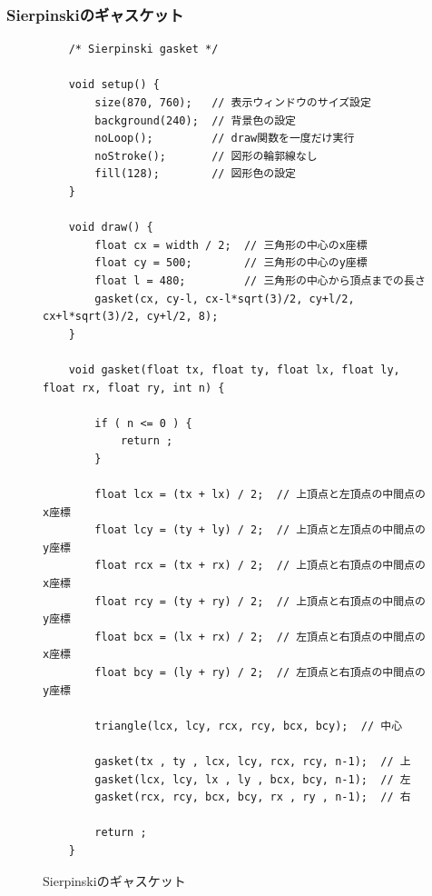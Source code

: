 \documentclass[dvipdfmx]{jsarticle}
\theoremstyle{definition}
\begin{document}
\newpage{}

\subsubsection{Sierpinskiのギャスケット}
\label{code_gasket_all}
\begin{figure}[ht]
\begin{center}
\begin{oframed}
\footnotesize
\begin{verbatim}
    /* Sierpinski gasket */

    void setup() {
        size(870, 760);   // 表示ウィンドウのサイズ設定
        background(240);  // 背景色の設定
        noLoop();         // draw関数を一度だけ実行
        noStroke();       // 図形の輪郭線なし
        fill(128);        // 図形色の設定
    }

    void draw() {
        float cx = width / 2;  // 三角形の中心のx座標
        float cy = 500;        // 三角形の中心のy座標
        float l = 480;         // 三角形の中心から頂点までの長さ
        gasket(cx, cy-l, cx-l*sqrt(3)/2, cy+l/2, cx+l*sqrt(3)/2, cy+l/2, 8);
    }

    void gasket(float tx, float ty, float lx, float ly, float rx, float ry, int n) {

        if ( n <= 0 ) {
            return ;
        }

        float lcx = (tx + lx) / 2;  // 上頂点と左頂点の中間点のx座標
        float lcy = (ty + ly) / 2;  // 上頂点と左頂点の中間点のy座標
        float rcx = (tx + rx) / 2;  // 上頂点と右頂点の中間点のx座標
        float rcy = (ty + ry) / 2;  // 上頂点と右頂点の中間点のy座標
        float bcx = (lx + rx) / 2;  // 左頂点と右頂点の中間点のx座標
        float bcy = (ly + ry) / 2;  // 左頂点と右頂点の中間点のy座標

        triangle(lcx, lcy, rcx, rcy, bcx, bcy);  // 中心

        gasket(tx , ty , lcx, lcy, rcx, rcy, n-1);  // 上
        gasket(lcx, lcy, lx , ly , bcx, bcy, n-1);  // 左
        gasket(rcx, rcy, bcx, bcy, rx , ry , n-1);  // 右

        return ;
    }
\end{verbatim}
\end{oframed}
\end{center}
\caption{Sierpinskiのギャスケット}
\end{figure}


\newpage{}
\end{document}
